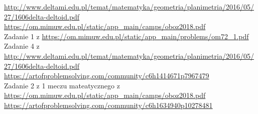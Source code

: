 
 \url{http://www.deltami.edu.pl/temat/matematyka/geometria/planimetria/2016/05/27/1606delta-deltoid.pdf} \\
 \url{https://om.mimuw.edu.pl/static/app_main/camps/oboz2018.pdf} \\
 Zadanie 1 z \url{https://om.mimuw.edu.pl/static/app_main/problems/om72_1.pdf} \\
 Zadanie 4 z \url{http://www.deltami.edu.pl/temat/matematyka/geometria/planimetria/2016/05/27/1606delta-deltoid.pdf} \\
 \url{ https://artofproblemsolving.com/community/c6h1414671p7967479} \\
 Zadanie 2 z 1 meczu mateatycznego z \url{https://om.mimuw.edu.pl/static/app_main/camps/oboz2018.pdf} \\
 \url{https://artofproblemsolving.com/community/c6h1634940p10278481} \\



